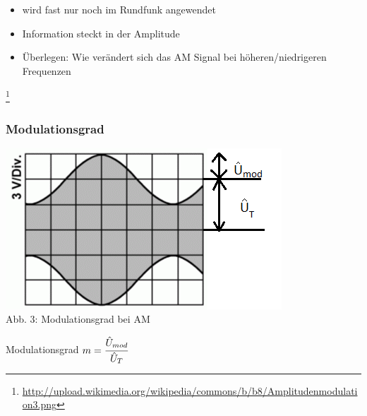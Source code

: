 \begin{frame}
\begin{minipage}{0.3\textwidth}
\end{minipage}
\hspace{0.5cm}
\begin{minipage}{0.5\textwidth}	
	\begin{itemize}
		\item wird fast nur noch im Rundfunk angewendet
		\item Information steckt in der Amplitude
        \item Überlegen: Wie verändert sich das AM Signal bei höheren/niedrigeren Frequenzen
	\end{itemize}
\end{minipage}
\footnote{\url{http://upload.wikimedia.org/wikipedia/commons/b/b8/Amplitudenmodulation3.png}}
\end{frame}

\begin{frame}
\frametitle{Modulationsgrad}
\begin{center}
\includegraphics[scale=0.65]{e14/TE103.png}\\
Abb. 3: Modulationsgrad bei AM

\hspace{0.5cm}

\begin{block}{Modulationsgrad}
  $m = \cfrac{\hat{U}_{mod}}{\hat{U}_T}$
\end{block}
\end{center}
\end{frame}


